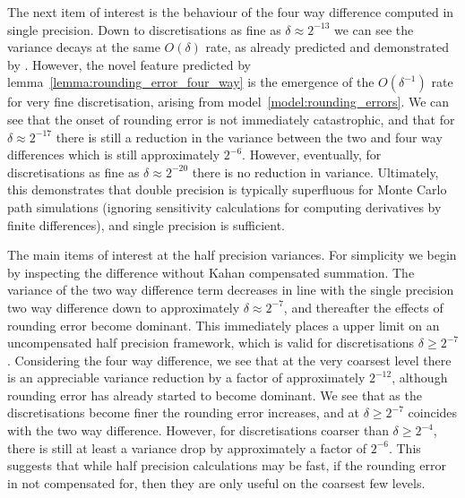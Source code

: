 \documentclass[manuscript,review]{acmart}
\begin{document}
The next item of interest is the behaviour of the four way difference computed in single precision. Down to discretisations as fine as $ \delta \approx 2^{-13} $ we can see the variance decays at the same $ O(\delta) $ rate, as already predicted and demonstrated by \citet[4.1]{giles2020approximating}. However, the novel feature predicted by lemma~\ref{lemma:rounding_error_four_way} is the emergence of the $ O(\delta^{-1}) $ rate  for very fine discretisation, arising from model~\ref{model:rounding_errors}. We can see that the onset of rounding error is not immediately catastrophic, and that for $ \delta \approx 2^{-17} $ there is still a reduction in the variance between the two and four way differences which is still approximately $ 2^{-6} $. However, eventually, for discretisations as fine as $ \delta \approx 2^{-20} $ there is no reduction in variance. Ultimately, this demonstrates that double precision is typically superfluous for Monte Carlo path simulations (ignoring sensitivity calculations for computing derivatives by finite differences), and single precision is sufficient. 

The main items of interest at the half precision variances. For simplicity we begin by inspecting the difference without Kahan compensated summation. The variance of the two way difference term decreases in line with the single precision two way difference down to approximately $ \delta \approx 2^{-7} $, and thereafter the effects of rounding error become dominant. This immediately places a upper limit on an uncompensated half precision framework, which is valid for discretisations $ \delta \geq 2^{-7} $. Considering the four way difference, we see that at the very coarsest level there is an appreciable variance reduction by a factor of approximately $ 2^{-12} $, although rounding error has already started to become dominant. We see that as the discretisations become finer the rounding error increases, and at $ \delta \geq 2^{-7} $ coincides with the two way difference. However, for discretisations coarser than $ \delta \geq 2^{-4} $, there is still at least a variance drop by approximately a factor of $ 2^{-6} $. This suggests that while half precision calculations may be fast, if the rounding error in not compensated for, then they are only useful on the coarsest few levels. 
\end{document}

